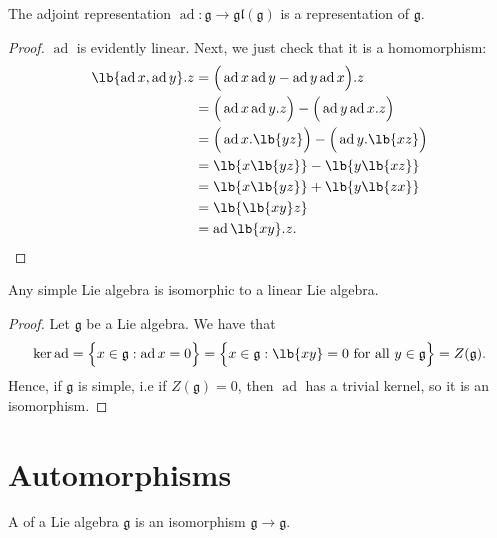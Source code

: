 \documentclass{article}
\DeclarePairedDelimiter\lb\lbrack\rbrack
\DeclareMathOperator{\ad}{ad}
\newcommand*\frkg{{\ensuremath{\mathfrak{g}}}}
\newcommand*\glalg{\ensuremath{\mathfrak{gl}}}
\newcommand*\acts{.}
\begin{document}
\begin{theorem}
    The adjoint representation $\ad: \frkg \to \glalg(\frkg)$ is a representation of $\frkg$.
\end{theorem}

\begin{proof}
    $\ad$ is evidently linear.
    Next, we just check that it is a homomorphism:
    \begin{align*}
        \lb{\ad x, \ad y} \acts z
        &=
        \Big(\ad x \ad y - \ad y \ad x\Big) \acts z 
        \\
        &=
        \Big(\ad x \ad y \acts z\Big) - \Big(\ad y \ad x \acts z\Big) 
        \\
        &=
        \Big(
            \ad x \acts \lb{yz}
        \Big)
        - 
        \Big(
            \ad y \acts \lb{xz}
        \Big)
        \\
        &=
        \lb{x\lb{yz}} - \lb{y\lb{xz}}
        \\
        &=
        \lb{x\lb{yz}} + \lb{y\lb{zx}}
        \\
        &=
        \lb{\lb{xy}z}
        \\
        &=
        \ad \lb{xy} \acts z.
    \end{align*}
\end{proof}

\begin{corollary}
    Any simple Lie algebra is isomorphic to a linear Lie algebra.
\end{corollary}

\begin{proof}
    Let $\frkg$ be a Lie algebra.
    We have that
    \[
        \ker \ad 
        =
        \Big\{
            x \in \frkg: \ad x = 0
        \Big\}
        =
        \Big\{
            x \in \frkg: \lb{xy} = 0 \text{ for all } y \in \frkg
        \Big\}
        =
        Z(\frkg).
    \]
    Hence, if $\frkg$ is simple, i.e if $Z(\frkg) = 0$, then $\ad$ has a trivial kernel, so it is an isomorphism. 
\end{proof}

\section{Automorphisms}

\begin{definition}
    A  of a Lie algebra $\frkg$ is an isomorphism $\frkg \to \frkg$.
\end{definition}
\end{document}

